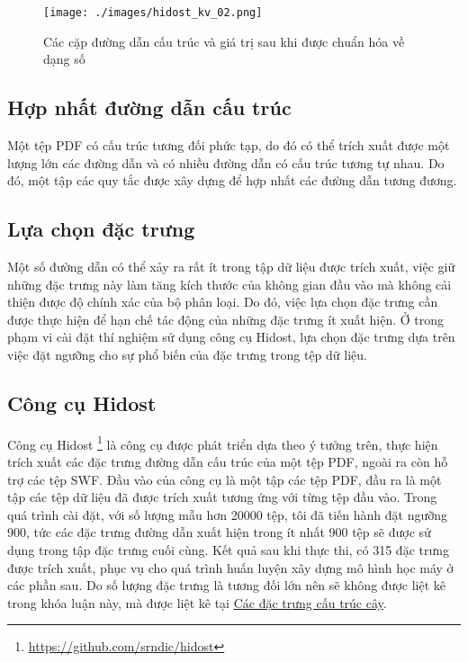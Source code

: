\documentclass[./../main.tex]{subfiles}
\begin{document}
\begin{figure}[H]
	\centering
	\texttt{[image: ./images/hidost\_kv\_02.png]}
	\caption{Các cặp đường dẫn cấu trúc và giá trị sau khi được chuẩn hóa về dạng số \cite{hidost}}
	\label{fig:hidost_kv_02}
\end{figure}


\subsection*{Hợp nhất đường dẫn cấu trúc}
Một tệp PDF có cấu trúc tương đối phức tạp, do đó có thể trích xuất được một lượng lớn các đường dẫn và có nhiều đường dẫn có cấu trúc tương tự nhau. Do đó, một tập các quy tắc được xây dựng để hợp nhất các đường dẫn tương đương.


\subsection*{Lựa chọn đặc trưng}
Một số đường dẫn có thể xảy ra rất ít trong tập dữ liệu được trích xuất, việc giữ những đặc trưng này làm tăng kích thước của không gian đầu vào mà không cải thiện được độ chính xác của bộ phân loại. Do đó, việc lựa chọn đặc trưng cần được thực hiện để hạn chế tác động của những đặc trưng ít xuất hiện. Ở trong phạm vi cài đặt thí nghiệm sử dụng công cụ Hidost, lựa chọn đặc trưng dựa trên việc đặt ngưỡng cho sự phổ biến của đặc trưng trong tệp dữ liệu.


\subsection*{Công cụ Hidost}
Công cụ Hidost \footnote{\url{https://github.com/srndic/hidost}} là công cụ được phát triển dựa theo ý tưởng trên, thực hiện trích xuất các đặc trưng đường dẫn cấu trúc của một tệp PDF, ngoài ra còn hỗ trợ các tệp SWF. Đầu vào của công cụ là một tập các tệp PDF, đầu ra là một tập các tệp dữ liệu đã được trích xuất tương ứng với từng tệp đầu vào. Trong quá trình cài đặt, với số lượng mẫu hơn 20000 tệp, tôi đã tiến hành đặt ngưỡng 900, tức các đặc trưng đường dẫn xuất hiện trong ít nhất 900 tệp sẽ được sử dụng trong tập đặc trưng cuối cùng. Kết quả sau khi thực thi, có 315 đặc trưng được trích xuất, phục vụ cho quá trình huấn luyện xây dựng mô hình học máy ở các phần sau. Do số lượng đặc trưng là tương đối lớn nên sẽ không được liệt kê trong khóa luận này, mà được liệt kê tại \href{https://docs.google.com/spreadsheets/d/1KLXWeywZy-YMoBGRXR1Oxle_OgLIHJUKCSUHza2meOc/edit#gid=0}{\underline{Các đặc trưng cấu trúc cây}}.
\end{document}
